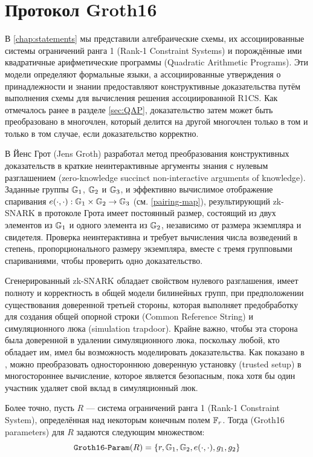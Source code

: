 \section{Протокол Groth16}
\label{sec:gorth_16}
 В \chaptname{} \ref{chap:statements} мы представили алгебраические схемы, их ассоциированные системы ограничений ранга 1 (Rank-1 Constraint Systems) и порождённые ими квадратичные арифметические программы (Quadratic Arithmetic Programs). Эти модели определяют формальные языки, а ассоциированные утверждения о принадлежности и знании предоставляют конструктивные доказательства путём выполнения схемы для вычисления решения ассоциированной R1CS. Как отмечалось ранее в разделе \ref{sec:QAP}, доказательство затем может быть преобразовано в многочлен, который делится на другой многочлен только в том и только в том случае, если доказательство корректно.
 
В \cite{Groth16} Йенс Грот (Jens Groth) разработал метод преобразования конструктивных доказательств в краткие неинтерактивные аргументы знания с нулевым разглашением (zero-knowledge succinct non-interactive arguments of knowledge). Заданные группы $\mathbb{G}_1$, $\mathbb{G}_2$ и $\mathbb{G}_3$, и эффективно вычислимое отображение спаривания $e(\cdot,\cdot): \mathbb{G}_1 \times \mathbb{G}_2 \to \mathbb{G}_3$ (см. \ref{pairing-map}), результирующий zk-SNARK в протоколе Грота имеет постоянный размер, состоящий из двух элементов из $\mathbb{G}_1$ и одного элемента из $\mathbb{G}_2$, независимо от размера экземпляра и свидетеля. Проверка неинтерактивна и требует вычисления числа возведений в степень, пропорционального размеру экземпляра, вместе с тремя групповыми спариваниями, чтобы проверить одно доказательство.

Сгенерированный zk-SNARK обладает свойством нулевого разглашения, имеет полноту и корректность в общей модели билинейных групп, при предположении существования доверенной третьей стороны, которая выполняет предобработку для создания общей опорной строки (Common Reference String) и симуляционного люка (simulation trapdoor). Крайне важно, чтобы эта сторона была доверенной в удалении симуляционного люка, поскольку любой, кто обладает им, имел бы возможность моделировать доказательства. Как показано в \cite{bowe-17}, можно преобразовать одностороннюю доверенную установку (trusted setup) в многостороннее вычисление, которое является безопасным, пока хотя бы один участник удаляет свой вклад в симуляционный люк.

Более точно, пусть $R$ --- система ограничений ранга 1 (Rank-1 Constraint System), определённая над некоторым конечным полем $\mathbb{F}_r$. Тогда  (Groth16 parameters) для $R$ задаются следующим множеством:
\begin{equation}
\label{groth16-parameters}
\mathtt{Groth16\text{-}Param}(R)= \{ r, \mathbb{G}_1, \mathbb{G}_2, e(\cdot,\cdot), g_1,g_2 \}
\end{equation}

